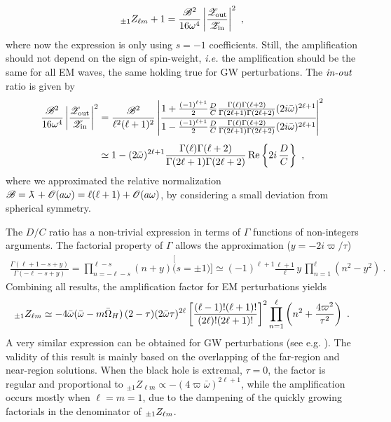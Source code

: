 \begin{align}
    \label{eq3:amplificationBAoutAin}
    \uu[\pm1]{Z}{\ell m} +1 = \frac{\mathscr{B}^2}{16 \omega^4} \left| \frac{\mathscr{Z}_\mathrm{out}}{\mathscr{Z}_\mathrm{in} } \right|^2 ~,
\end{align}
where now the expression is only using $s=-1$ coefficients.
Still, the amplification should not depend on the sign of spin-weight, \emph{i.e.} the amplification should be the same for all EM waves, the same holding true for GW perturbations.
The $\emph{in-out}$ ratio is given by
\begin{align}
    \begin{split}
        \frac{\mathscr{B}^2}{16 \omega^4} \left| \frac{\mathscr{Z}_\mathrm{out}}{\mathscr{Z}_\mathrm{in} } \right|^2 &= 
        \frac{\mathscr{B}^2}{\ell^2(\ell+1)^2} 
        \left|\cfrac{ 
            1+ \frac{(-1)^{\ell+1}}{2} \frac{D}{C} 
            \frac{\Gamma(\ell) \Gamma(\ell+2)}{\Gamma(2\ell+1) \Gamma(2\ell+2)} 
            (2 i\bar{\omega})^{2\ell+1}
            }{
            1 - \frac{(-1)^{\ell+1}}{2} \frac{D}{C}
            \frac{\Gamma(\ell) \Gamma(\ell+2)}{\Gamma(2\ell+1) \Gamma(2\ell+2)}
            (2 i\bar{\omega})^{2\ell+1}
        }\right|^2 \\[0.15cm]
        & \simeq  1 - (2 \bar{\omega})^{2\ell+1}
        \frac{\Gamma(\ell) \Gamma(\ell+2)}{\Gamma(2\ell+1) \Gamma(2\ell+2)} \,\Re\left\{2 i \,\frac{D}{C}\right\} ~,
    \end{split}
\end{align}
where we approximated the relative normalization $\mathscr{B} = \lambdabar + \mathscr{O}(a\omega) = \ell(\ell+1) + \mathscr{O}(a\omega)$, by considering a small deviation from spherical symmetry.

The $D/C$ ratio has a non-trivial expression in terms of $\Gamma$ functions of non-integers arguments. The factorial property of $\Gamma$ allows the approximation ($y = - 2 i \varpi/\tau$)
\begin{align}
    \frac{\Gamma(\ell+1-s + y)}{\Gamma(-\ell - s + y)} = \prod_{n=-\ell-s}^{\ell-s} (n + y) \stackrel[(s=\pm 1)]{}{\simeq} (-1)^{\ell+1} \frac{\ell+1}{\ell} \, y \,\prod_{n=1}^{\ell} (n^2 - y^2) ~.
\end{align}
Combining all results, the amplification factor for EM perturbations yields
\begin{align}
    \label{eq3:ZfactorEM}
    \uu[\pm1]{Z}{\ell m} \simeq  - 4 \bar{\omega} (\bar{\omega} - m \bar{\Omega}_H) \,(2-\tau)(2\bar{\omega} \tau)^{2\ell} \left[\frac{(\ell-1)! (\ell+1)!}{(2\ell)! (2\ell+1)!}\right]^2 \prod_{n=1}^{\ell} \left(n^2 + \frac{4 \varpi^2}{\tau^2} \right) ~.
\end{align}
A very similar expression can be obtained for GW perturbations (see e.g. \cite{Rosa2016}).
The validity of this result is mainly based on the overlapping of the far-region and near-region solutions.
When the black hole is extremal, $\tau=0$, the factor is regular and proportional to ${}_{\pm1}Z_{\ell m}\propto - (4 \varpi \bar{\omega})^{2\ell+1}$, while the amplification occurs mostly when $\ell=m=1$, due to the dampening of the quickly growing factorials in the denominator of $\uu[\pm1]{Z}{\ell m}$.

